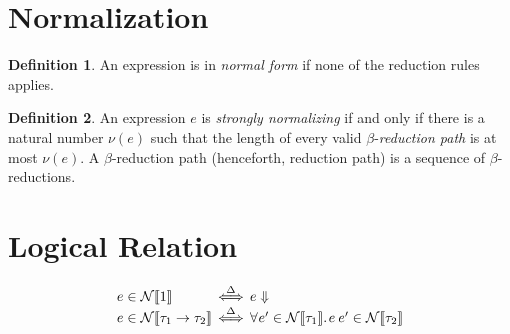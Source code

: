 \documentclass{article}
\theoremstyle{definition}
\newtheorem{definition}{Definition}
\begin{document}
\section*{Normalization}
\begin{definition}
  An expression is in \emph{normal form} if none of the reduction rules applies.
\end{definition}

\begin{definition}
  An expression $e$ is \emph{strongly normalizing} if and only if there is a natural number $\nu(e)$ such that the length of every valid $\beta$-\emph{reduction path} is at most $\nu(e)$.
  A $\beta$-reduction path (henceforth, reduction path) is a sequence of $\beta$-reductions.
\end{definition}

\section*{Logical Relation}
\[
  \begin{array}{l@{\,\iffdef\,}l}
    e \in \LRN{1} & \Normalizes{e}\\
    e \in \LRN{\tau_{1} \to \tau_{2}} & \Forall{e' \in \LRN{\tau_{1}}}{\App{e}{e'} \in \LRN{\tau_{2}}}
  \end{array}
\]
\end{document}
